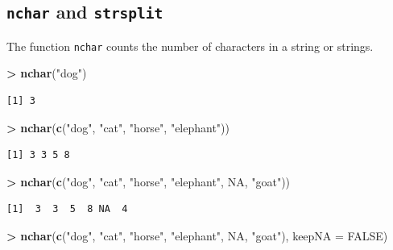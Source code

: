 \documentclass[
]{krantz}
\makeatletter
\newenvironment{Shaded}{\begin{snugshade}}{\end{snugshade}}
\newcommand{\DataTypeTok}[1]{\textcolor[rgb]{0.27,0.27,0.27}{#1}}
\newcommand{\KeywordTok}[1]{\textcolor[rgb]{0.27,0.27,0.27}{\textbf{#1}}}
\newcommand{\NormalTok}[1]{#1}
\newcommand{\OperatorTok}[1]{\textcolor[rgb]{0.43,0.43,0.43}{\textbf{#1}}}
\newcommand{\OtherTok}[1]{\textcolor[rgb]{0.37,0.37,0.37}{#1}}
\newcommand{\StringTok}[1]{\textcolor[rgb]{0.5,0.5,0.5}{#1}}
\newenvironment{kframe}{%
\medskip{}
\setlength{\fboxsep}{.8em}
 \def\at@end@of@kframe{}%
 \ifinner\ifhmode%
  \def\at@end@of@kframe{\end{minipage}}%
  \begin{minipage}{\columnwidth}%
 \fi\fi%
 \def\FrameCommand##1{\hskip\@totalleftmargin \hskip-\fboxsep
 \colorbox{shadecolor}{##1}\hskip-\fboxsep
     \hskip-\linewidth \hskip-\@totalleftmargin \hskip\columnwidth}%
 \MakeFramed {\advance\hsize-\width
   \@totalleftmargin\z@ \linewidth\hsize
   \@setminipage}}%
 {\par\unskip\endMakeFramed%
 \at@end@of@kframe}
\renewenvironment{Shaded}{\begin{kframe}}{\end{kframe}}
\makeatother
\begin{document}
\hypertarget{nchar-and-strsplit}{%
\subsection{\texorpdfstring{\texttt{nchar} and \texttt{strsplit}}{nchar and strsplit}}\label{nchar-and-strsplit}}

The function \texttt{nchar} counts the number of characters in a string or strings.

\begin{Shaded}
\begin{Highlighting}[]
\OperatorTok{\textgreater{}}\StringTok{ }\KeywordTok{nchar}\NormalTok{(}\StringTok{"dog"}\NormalTok{)}
\end{Highlighting}
\end{Shaded}

\begin{verbatim}
[1] 3
\end{verbatim}

\begin{Shaded}
\begin{Highlighting}[]
\OperatorTok{\textgreater{}}\StringTok{ }\KeywordTok{nchar}\NormalTok{(}\KeywordTok{c}\NormalTok{(}\StringTok{"dog"}\NormalTok{, }\StringTok{"cat"}\NormalTok{, }\StringTok{"horse"}\NormalTok{, }\StringTok{"elephant"}\NormalTok{))}
\end{Highlighting}
\end{Shaded}

\begin{verbatim}
[1] 3 3 5 8
\end{verbatim}

\begin{Shaded}
\begin{Highlighting}[]
\OperatorTok{\textgreater{}}\StringTok{ }\KeywordTok{nchar}\NormalTok{(}\KeywordTok{c}\NormalTok{(}\StringTok{"dog"}\NormalTok{, }\StringTok{"cat"}\NormalTok{, }\StringTok{"horse"}\NormalTok{, }\StringTok{"elephant"}\NormalTok{, }\OtherTok{NA}\NormalTok{, }\StringTok{"goat"}\NormalTok{))}
\end{Highlighting}
\end{Shaded}

\begin{verbatim}
[1]  3  3  5  8 NA  4
\end{verbatim}

\begin{Shaded}
\begin{Highlighting}[]
\OperatorTok{\textgreater{}}\StringTok{ }\KeywordTok{nchar}\NormalTok{(}\KeywordTok{c}\NormalTok{(}\StringTok{"dog"}\NormalTok{, }\StringTok{"cat"}\NormalTok{, }\StringTok{"horse"}\NormalTok{, }\StringTok{"elephant"}\NormalTok{, }\OtherTok{NA}\NormalTok{, }\StringTok{"goat"}\NormalTok{), }\DataTypeTok{keepNA =} \OtherTok{FALSE}\NormalTok{)}
\end{Highlighting}
\end{Shaded}
\end{document}
